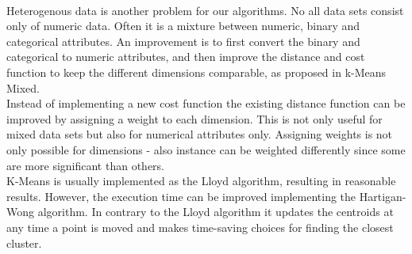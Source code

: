 \\
Heterogenous data is another problem for our algorithms. No all data sets consist only of numeric data. Often it is a mixture between numeric, binary and categorical attributes. An improvement is to first convert the binary and categorical to numeric attributes, and then improve the distance and cost function to keep the different dimensions comparable, as proposed in k-Means Mixed.
\\
Instead of implementing a new cost function the existing distance function can be improved by assigning a weight to each dimension. This is not only useful for mixed data sets but also for numerical attributes only. Assigning weights is not only possible for dimensions - also instance can be weighted differently since some are more significant than others.
\\
K-Means is usually implemented as the Lloyd algorithm, resulting in reasonable results. However, the execution time can be improved implementing the Hartigan-Wong algorithm. In contrary to the Lloyd algorithm it updates the centroids at any time a point is moved and makes time-saving choices for finding the closest cluster.
\\

